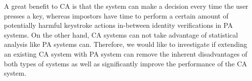 \documentclass[informationsecurity]{gucmasterproject}
\begin{document}
A great benefit to CA is that the system can make a decision every time the user presses a key, whereas impostors have time to perform a certain amount of potentially harmful keystroke actions in-between identity verifications in PA systems.
On the other hand, CA systems can not take advantage of statistical analysis like PA systems can.
Therefore, we would like to investigate if extending an existing CA system with PA system can remove the inherent disadvantages of both types of systems as well as significantly improve the performance of the CA system.


%
%
\end{document}
